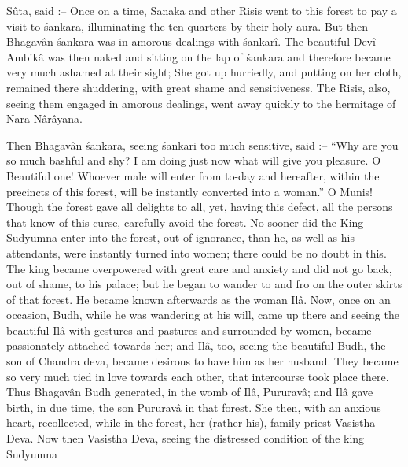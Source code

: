 S\^uta, said :-- Once on a time, Sanaka and other Risis went to this forest to pay a visit to \'sankara, illuminating the ten quarters by their holy aura. But then Bhagav\^an \'sankara was in amorous dealings with \'sankar\^i. The beautiful Dev\^i Ambik\^a was then naked and sitting on the lap of \'sankara and therefore became very much ashamed at their sight; She got up hurriedly, and putting on her cloth, remained there shuddering, with great shame and sensitiveness. The Risis, also, seeing them engaged in amorous dealings, went away quickly to the hermitage of Nara N\^ar\^ayana.

Then Bhagav\^an \'sankara, seeing \'sankari too much sensitive, said :-- ``Why are you so much bashful and shy? I am doing just now what will give you pleasure. O Beautiful one! Whoever male will enter from to-day and hereafter, within the precincts of this forest, will be instantly converted into a woman.'' O Munis! Though the forest gave all delights to all, yet, having this defect, all the persons that know of this curse, carefully avoid the forest. No sooner did the King Sudyumna enter into the forest, out of ignorance, than he, as well as his attendants, were instantly turned into women; there could be no doubt in this. The king became overpowered with great care and anxiety and did not go back, out of shame, to his palace; but he began to wander to and fro on the outer skirts of that forest. He became known afterwards as the woman Il\^a. Now, once on an occasion, Budh, while he was wandering at his will, came up there and seeing the beautiful Il\^a with gestures and pastures and surrounded by women, became passionately attached towards her; and Il\^a, too, seeing the beautiful Budh, the son of Chandra deva, became desirous to have him as her husband. They became so very much tied in love towards each other, that intercourse took place there. Thus Bhagav\^an Budh generated, in the womb of Il\^a, Pururav\^a; and Il\^a gave birth, in due time, the son Pururav\^a in that forest. She then, with an anxious heart, recollected, while in the forest, her (rather his), family priest Vasistha Deva. Now then Vasistha Deva, seeing the distressed condition of the king Sudyumna

